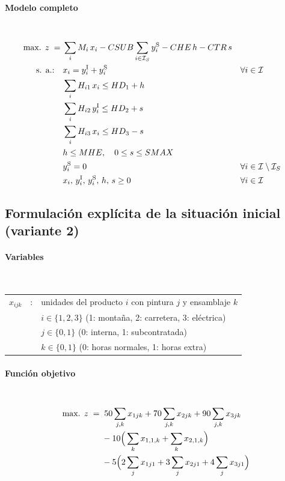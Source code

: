 \paragraph{Modelo completo}\mbox{}\\[-1mm]
\begin{align}
\mbox{max. } z \;=\;&
\sum_i M_i\, x_i
- CSUB \sum_{i\in\mathcal{I}_S} y_i^{\mathrm{S}}
- CHE\, h
- CTR\, s \notag\\
\mbox{s. a.:}\quad
& x_i = y_i^{\mathrm{I}} + y_i^{\mathrm{S}} && \forall i \in \mathcal{I} \notag\\
& \sum_i H_{i1}\, x_i \leq HD_1 + h \notag\\
& \sum_i H_{i2}\, y_i^{\mathrm{I}} \leq HD_2 + s \notag\\
& \sum_i H_{i3}\, x_i \leq HD_3 - s \notag\\
& h \leq MHE,\quad 0 \leq s \leq SMAX \notag\\
& y_i^{\mathrm{S}} = 0 && \forall i \in \mathcal{I}\setminus\mathcal{I}_S \notag\\
& x_i,\, y_i^{\mathrm{I}},\, y_i^{\mathrm{S}},\, h,\, s \geq 0 && \forall i \in \mathcal{I} \notag
\end{align}



\subsection{Formulación explícita de la situación inicial (variante 2)}

\paragraph{Variables}\mbox{}\\
\begin{tabular}{lcl}
$x_{ijk}$ & : & unidades del producto $i$ con pintura $j$ y ensamblaje $k$ \\
          &   & $i\in\{1,2,3\}$ (1: montaña, 2: carretera, 3: eléctrica) \\
          &   & $j\in\{0,1\}$ (0: interna, 1: subcontratada) \\
          &   & $k\in\{0,1\}$ (0: horas normales, 1: horas extra) \\
\end{tabular}

\paragraph{Función objetivo}\mbox{}\\
\begin{align}
\mbox{max. } z \;=\;
& \;50\sum_{j,k} x_{1jk} + 70\sum_{j,k} x_{2jk} + 90\sum_{j,k} x_{3jk} \notag\\
& - 10\Big(\sum_{k} x_{1,1,k} + \sum_{k} x_{2,1,k}\Big) \notag\\
& - 5\Big( 2\sum_{j} x_{1j1} + 3\sum_{j} x_{2j1} + 4\sum_{j} x_{3j1} \Big)
\end{align}

